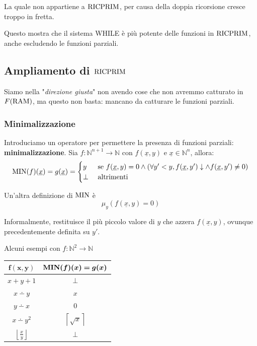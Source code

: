 La quale non appartiene a $\text{RICPRIM}$, per causa della doppia ricorsione cresce troppo in fretta.

Questo mostra che il sistema WHILE è più potente delle funzioni in $\text{RICPRIM}$, anche escludendo le funzioni parziali.

\subsection{Ampliamento di $\text{RICPRIM}$}
Siamo nella "\textit{direzione giusta}" non avendo cose che non avremmo catturato in $F(\text{RAM})$, ma questo non basta: mancano da catturare le funzioni parziali.

\begin{center}
	\scalebox{0.8}{}
\end{center}

\subsubsection{Minimalizzazione}

Introduciamo un operatore per permettere la presenza di funzioni parziali: \textbf{minimalizzazione}. Sia $f: \mathbb{N}^{n+1} \rightarrow \mathbb{N}$ con $f(\underline{x}, y)$ e $\underline{x} \in \mathbb{N}^n$, allora: 
$$
\operatorname{MIN} (f) (\underline{x}) = g(\underline{x}) = \begin{cases}
	y & \text{ se } f(\underline{x}, y) = 0 \wedge (\forall y' < y, f(\underline{x}, y') \downarrow \wedge f(\underline{x}, y') \neq 0) \\
	\bot & \text{ altrimenti}
\end{cases}
$$

Un'altra definizione di $\operatorname{MIN}$ è 
$$ \mu_y (f(\underline{x}, y) = 0)$$

Informalmente, restituisce il più piccolo valore di $y$ che azzera $f(\underline{x},y)$, ovunque precedentemente definita su $y'$.

Alcuni esempi con $f: \mathbb{N}^2 \rightarrow \mathbb{N}$
\begin{center}
	\begin{tabular}{c|c}
		$\bm{f(x,y)}$ & $\bm{\MIN(f)(x)=g(x)}$ \\ 
		\hline
		$x+y+1$ & $\bot$\\
		$x \dotminus y$ & $x$\\
		$y \dotminus x$ & $0$\\
		$x \dotminus y^2$ & $\left\lceil\sqrt{x}\right\rceil$\\
		$\left\lfloor\frac{x}{y}\right\rfloor$ & $\bot$\\
	\end{tabular}
\end{center}


